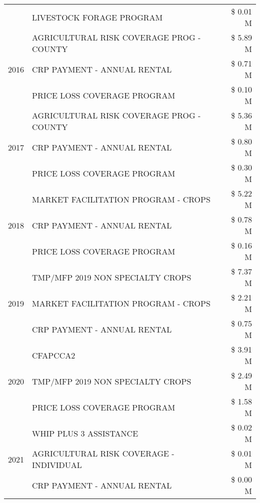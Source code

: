 \begin{tabular}{llr}
 & LIVESTOCK FORAGE PROGRAM & \$ 0.01 M \\
\cline{1-3}
\multirow[t]{3}{*}{2016} & AGRICULTURAL RISK COVERAGE PROG - COUNTY      & \$ 5.89 M \\
 & CRP PAYMENT - ANNUAL RENTAL                   & \$ 0.71 M \\
 & PRICE LOSS COVERAGE PROGRAM                   & \$ 0.10 M \\
\cline{1-3}
\multirow[t]{3}{*}{2017} & AGRICULTURAL RISK COVERAGE PROG - COUNTY & \$ 5.36 M \\
 & CRP PAYMENT - ANNUAL RENTAL & \$ 0.80 M \\
 & PRICE LOSS COVERAGE PROGRAM & \$ 0.30 M \\
\cline{1-3}
\multirow[t]{3}{*}{2018} & MARKET FACILITATION PROGRAM - CROPS & \$ 5.22 M \\
 & CRP PAYMENT - ANNUAL RENTAL & \$ 0.78 M \\
 & PRICE LOSS COVERAGE PROGRAM & \$ 0.16 M \\
\cline{1-3}
\multirow[t]{3}{*}{2019} & TMP/MFP 2019 NON SPECIALTY CROPS & \$ 7.37 M \\
 & MARKET FACILITATION PROGRAM - CROPS & \$ 2.21 M \\
 & CRP PAYMENT - ANNUAL RENTAL & \$ 0.75 M \\
\cline{1-3}
\multirow[t]{3}{*}{2020} & CFAPCCA2 & \$ 3.91 M \\
 & TMP/MFP 2019 NON SPECIALTY CROPS & \$ 2.49 M \\
 & PRICE LOSS COVERAGE PROGRAM & \$ 1.58 M \\
\cline{1-3}
\multirow[t]{3}{*}{2021} & WHIP PLUS 3 ASSISTANCE & \$ 0.02 M \\
 & AGRICULTURAL RISK COVERAGE - INDIVIDUAL & \$ 0.01 M \\
 & CRP PAYMENT - ANNUAL RENTAL & \$ 0.00 M \\
\cline{1-3}
\bottomrule
\end{tabular}
